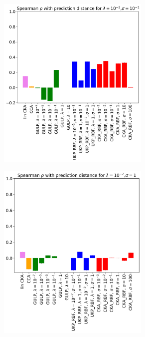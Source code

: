 \documentclass[11pt]{article}
\theoremstyle{plain}
\begin{document}
\begin{figure}[!h]
    \centering
    \begin{subfigure}[b]{0.45\textwidth}
        \includegraphics[width=0.8\textwidth]{Appendix figures/mnist_experiments/krrgen/png/generalization(includingCKARBF)_lambda0.01_sigma0.1.png}
    \end{subfigure}
    \hfill
    \begin{subfigure}[b]{0.45\textwidth}
        \includegraphics[width=0.8\textwidth]{Appendix figures/mnist_experiments/krrgen/png/generalization(includingCKARBF)_lambda0.01_sigma1.png}
    \end{subfigure}
    

\end{figure}
\end{document}

